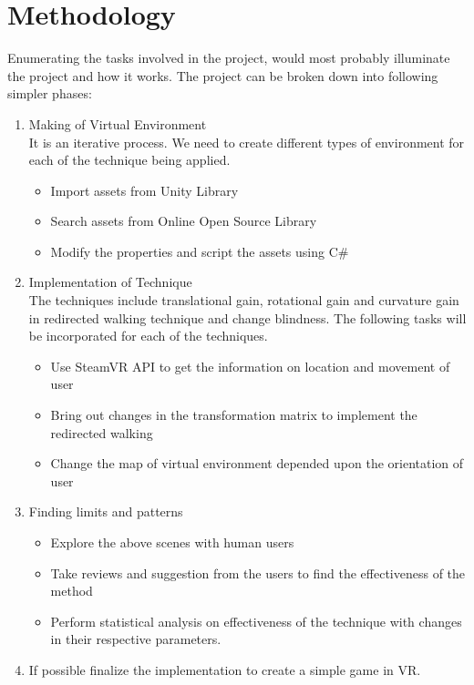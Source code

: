 \documentclass[12pt]{article}
\begin{document}
\clearpage

\section{Methodology}
Enumerating the tasks involved in the project, would most probably illuminate the project and how it works. The project can be broken down into following simpler phases:
\begin{enumerate}
\item Making of Virtual Environment 
\\
It is an iterative process. We need to create different types of environment for each of the technique being applied. 
\begin{itemize}
\item Import assets from Unity Library
\item Search assets from Online Open Source Library
\item Modify the properties and script the assets using C\#
\end{itemize}
\item Implementation of Technique
\\
The techniques include translational gain, rotational gain and curvature gain in redirected walking technique and change blindness. The following tasks will be incorporated for each of the techniques.
\begin{itemize}
\item Use SteamVR API to get the information on location and movement of user
\item Bring out changes in the transformation matrix to implement the redirected walking
\item Change the map of virtual environment depended upon the orientation of user
\end{itemize}
\item Finding limits and patterns
\begin{itemize}
\item Explore the above scenes with human users
\item Take reviews and suggestion from the users to find the effectiveness of the method
\item Perform statistical analysis on effectiveness of the technique with changes in their respective parameters.
\end{itemize}
\item If possible finalize the implementation to create a simple game in VR.
\end{enumerate}
\clearpage
\end{document}
